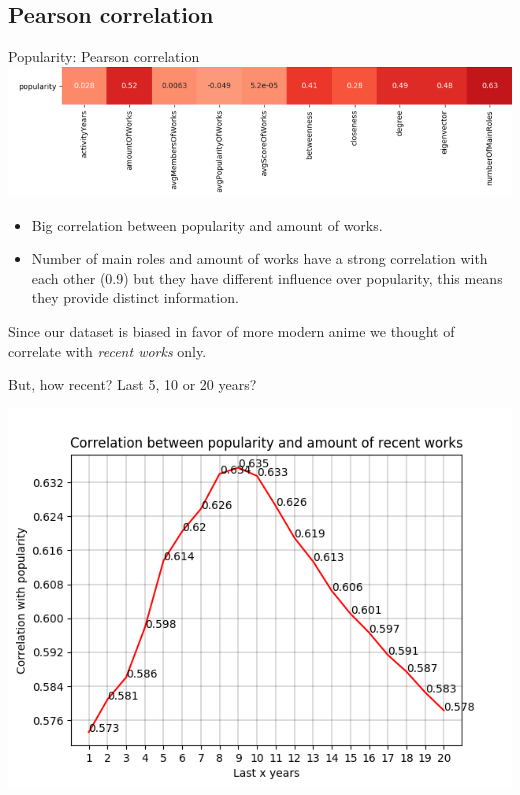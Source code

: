 \subsection{Pearson correlation}
\begin{frame}{Popularity: Pearson correlation}
\includegraphics[scale=0.45]{graphics/popCorrelationAllWorks.png} 
\begin{itemize}
\item Big correlation between popularity and amount of works. %
\item Number of main roles and amount of works have a strong correlation with each other (0.9) but they have different influence over popularity, this means they provide distinct information.
\end{itemize}

\end{frame}

\begin{frame}
Since our dataset is biased in favor of more modern anime we thought of correlate with \emph{recent works} only.
\vspace{5pt}

But, how recent? Last 5, 10 or 20 years? 
\vspace{-5pt}

\begin{center}
\includegraphics[scale=0.6]{graphics/correlationPopRecentWorks.png} 
\end{center}

\end{frame}

